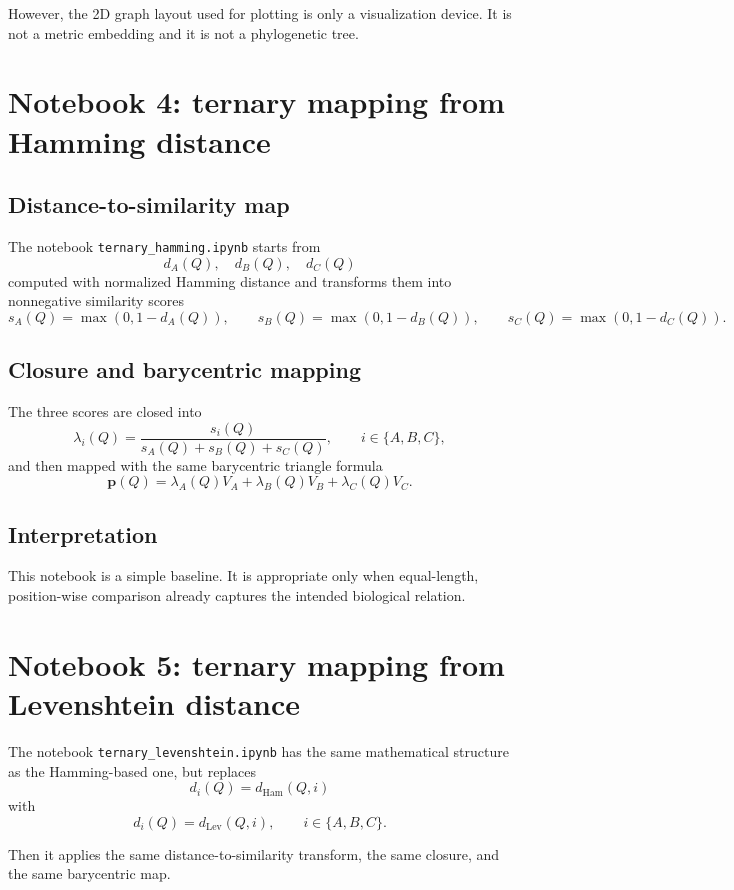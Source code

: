 \documentclass[11pt,a4paper]{article}
\begin{document}
However, the 2D graph layout used for plotting is only a visualization device. It is not a metric embedding and it is not a phylogenetic tree.

\section{Notebook 4: ternary mapping from Hamming distance}

\subsection{Distance-to-similarity map}

The notebook \texttt{ternary\_hamming.ipynb} starts from
\[
d_A(Q),\quad d_B(Q),\quad d_C(Q)
\]
computed with normalized Hamming distance and transforms them into nonnegative similarity scores
\[
s_A(Q)=\max(0,1-d_A(Q)),\qquad
s_B(Q)=\max(0,1-d_B(Q)),\qquad
s_C(Q)=\max(0,1-d_C(Q)).
\]

\subsection{Closure and barycentric mapping}

The three scores are closed into
\[
\lambda_i(Q)=\frac{s_i(Q)}{s_A(Q)+s_B(Q)+s_C(Q)},\qquad i\in\{A,B,C\},
\]
and then mapped with the same barycentric triangle formula
\[
\bm{p}(Q)=\lambda_A(Q)V_A+\lambda_B(Q)V_B+\lambda_C(Q)V_C.
\]

\subsection{Interpretation}

This notebook is a simple baseline. It is appropriate only when equal-length, position-wise comparison already captures the intended biological relation.

\section{Notebook 5: ternary mapping from Levenshtein distance}

The notebook \texttt{ternary\_levenshtein.ipynb} has the same mathematical structure as the Hamming-based one, but replaces
\[
d_i(Q)=d_{\mathrm{Ham}}(Q,i)
\]
with
\[
d_i(Q)=d_{\mathrm{Lev}}(Q,i),\qquad i\in\{A,B,C\}.
\]

Then it applies the same distance-to-similarity transform, the same closure, and the same barycentric map.
\end{document}
